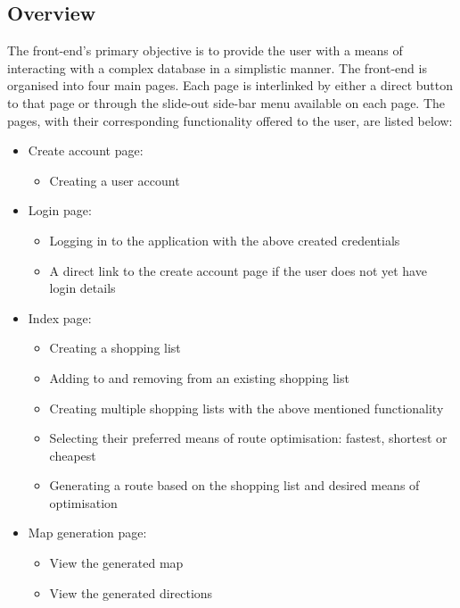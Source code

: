 \documentclass[10pt,twocolumn]{witseiepaper}
\begin{document}
\begin{center}
\end{center}

	\subsection{Overview}
	
		The front-end's primary objective is to provide the user with a means of interacting with a complex database in a simplistic manner. The front-end is organised into four main pages. Each page is interlinked by either a direct button to that page or through the slide-out side-bar menu available on each page. The pages, with their corresponding functionality offered to the user, are listed below:
		
		\begin{itemize}
			\item Create account page:
			\begin{itemize}
				\item Creating a user account
			\end{itemize}
			\item Login page:
			\begin{itemize}
				\item Logging in to the application with the above created credentials
				\item A direct link to the create account page if the user does not yet have login details
			\end{itemize}
			\item Index page:
			\begin{itemize}
				\item Creating a shopping list
				\item Adding to and removing from an existing shopping list
				\item Creating multiple shopping lists with the above mentioned functionality
				\item Selecting their preferred means of route optimisation: fastest, shortest or cheapest
				\item Generating a route based on the shopping list and desired means of optimisation
			\end{itemize}
			\item Map generation page:
			\begin{itemize}
				\item View the generated map
				\item View the generated directions
			\end{itemize}
		\end{itemize}
		
\end{document}

